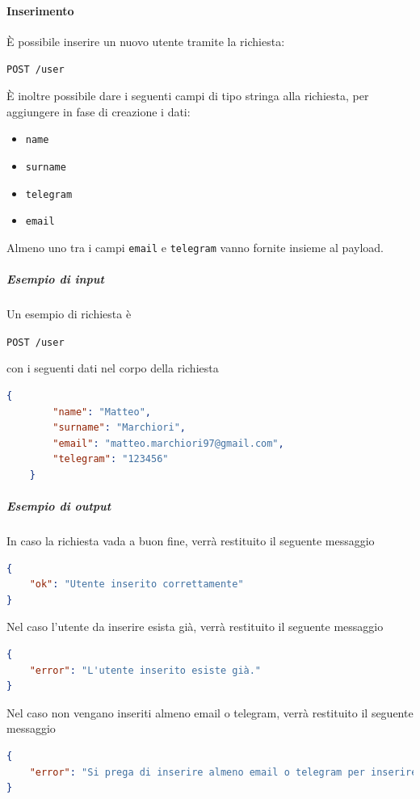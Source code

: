 \paragraph{Inserimento}
È possibile inserire un nuovo utente tramite la richiesta:
    \begin{center}
        \texttt{POST /user}
    \end{center}

È inoltre possibile dare i seguenti campi di tipo stringa alla richiesta, per aggiungere in fase di creazione i dati:
\begin{itemize}[noitemsep]
    \item \texttt{name}
    \item \texttt{surname}
    \item \texttt{telegram}
    \item \texttt{email}
\end{itemize}
Almeno uno tra i campi \texttt{email} e \texttt{telegram} vanno fornite insieme al payload.

    \subparagraph{Esempio di input}
    Un esempio di richiesta è
        \begin{center}
            \texttt{POST  /user}
        \end{center}
    con i seguenti dati nel corpo della richiesta
    \begin{lstlisting}[language = json]
    {
        "name": "Matteo",
        "surname": "Marchiori",
        "email": "matteo.marchiori97@gmail.com",
        "telegram": "123456"
    }
    \end{lstlisting}


    \subparagraph{Esempio di output}
    In caso la richiesta vada a buon fine, verrà restituito il seguente messaggio
    \begin{lstlisting}[language = json]
{
    "ok": "Utente inserito correttamente"
}
    \end{lstlisting}

    Nel caso l'utente da inserire esista già, verrà restituito il seguente messaggio
    \begin{lstlisting}[language = json]
{
    "error": "L'utente inserito esiste già."
}
    \end{lstlisting}

    Nel caso non vengano inseriti almeno email o telegram, verrà restituito il seguente messaggio
    \begin{lstlisting}[language = json]
{
    "error": "Si prega di inserire almeno email o telegram per inserire l'utente."
}
    \end{lstlisting}

